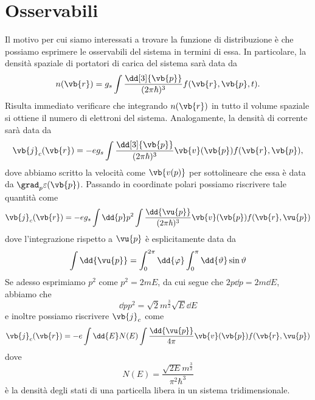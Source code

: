 \section{Osservabili}
Il motivo per cui siamo interessati a trovare la funzione di distribuzione è che possiamo esprimere le osservabili del sistema in termini di essa. In particolare, la densità spaziale di portatori di carica del sistema sarà data da
\begin{equation*}
    n(\vb{r})
    =g_s \int \frac{\dd[3]{\vb{p}}}{(2 \pi \hbar)^3} f(\vb{r},\vb{p},t).
\end{equation*}
Risulta immediato verificare che integrando $n(\vb{r})$ in tutto il volume spaziale si ottiene il numero di elettroni del sistema. Analogamente, la densità di corrente sarà data da
\begin{equation*}
    \vb{j}_c(\vb{r})
    =-e g_s \int \frac{\dd[3]{\vb{p}}}{(2 \pi \hbar)^3} \vb{v}(\vb{p}) f(\vb{r},\vb{p}),
\end{equation*}
dove abbiamo scritto la velocità come $\vb{v(p)}$ per sottolineare che essa è data da $\grad_p \varepsilon(\vb{p})$.
Passando in coordinate polari possiamo riscrivere tale quantità come
\begin{equation*}
    \vb{j}_c(\vb{r})
    =-e g_s \int \dd{p} p^2 \int \frac{\dd{\vu{p}}}{(2\pi\hbar)^3} \vb{v}(\vb{p}) f(\vb{r},\vu{p})
\end{equation*}
dove l'integrazione rispetto a $\vu{p}$ è esplicitamente data da
\begin{equation*}
    \int \dd{\vu{p}}
    =\int_{0}^{2\pi} \dd{\varphi} \int_{0}^{\pi} \dd{\vartheta} \sin{\vartheta}
\end{equation*}
Se adesso esprimiamo $p^2$ come $p^2=2mE$, da cui segue che $2p \dd{p}=2m \dd{E}$, abbiamo che
\begin{equation*}
    \dd{p} p^2
    =\sqrt{2} m^{\frac{3}{2}} \sqrt{E} \dd{E}
\end{equation*}
e inoltre possiamo riscrivere $\vb{j}_c$ come
\begin{equation*}
    \vb{j}_c(\vb{r})
    =-e \int \dd{E} N(E) \int \frac{\dd{\vu{p}}}{4\pi} \vb{v}(\vb{p}) f(\vb{r},\vu{p})
\end{equation*}
dove
\begin{equation*}
    N(E)
    =\frac{\sqrt{2E} m^{\frac{3}{2}}}{\pi^2 \hbar^3}
\end{equation*}
è la densità degli stati di una particella libera in un sistema tridimensionale.\\
